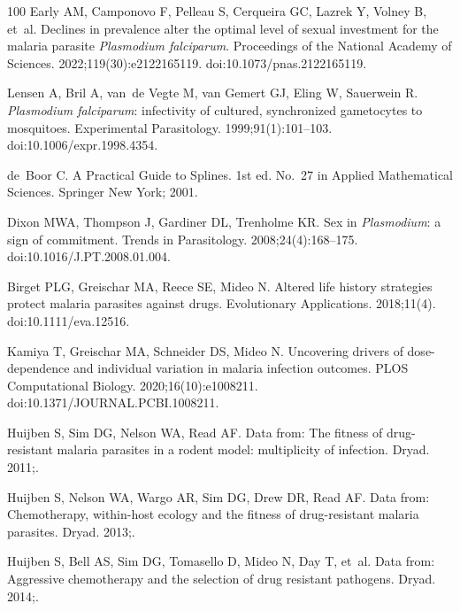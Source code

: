 \documentclass[10pt,letterpaper]{article}
\begin{document}
\begin{thebibliography}{100}
Early AM, Camponovo F, Pelleau S, Cerqueira GC, Lazrek Y, Volney B, et~al.
\newblock Declines in prevalence alter the optimal level of sexual investment for the malaria parasite \textit{{Plasmodium} falciparum}.
\newblock Proceedings of the National Academy of Sciences. 2022;119(30):e2122165119.
\newblock doi:{10.1073/pnas.2122165119}.

Lensen A, Bril A, van~de Vegte M, van Gemert GJ, Eling W, Sauerwein R.
\newblock \textit{{Plasmodium} falciparum}: infectivity of cultured, synchronized gametocytes to mosquitoes.
\newblock Experimental Parasitology. 1999;91(1):101--103.
\newblock doi:{10.1006/expr.1998.4354}.

de~Boor C.
\newblock A {Practical} {Guide} to {Splines}.
\newblock 1st ed. No.~27 in Applied {Mathematical} {Sciences}. Springer New York; 2001.

Dixon MWA, Thompson J, Gardiner DL, Trenholme KR.
\newblock Sex in \textit{{Plasmodium}}: a sign of commitment.
\newblock Trends in Parasitology. 2008;24(4):168--175.
\newblock doi:{10.1016/J.PT.2008.01.004}.

Birget PLG, Greischar MA, Reece SE, Mideo N.
\newblock Altered life history strategies protect malaria parasites against drugs.
\newblock Evolutionary Applications. 2018;11(4).
\newblock doi:{10.1111/eva.12516}.

Kamiya T, Greischar MA, Schneider DS, Mideo N.
\newblock Uncovering drivers of dose-dependence and individual variation in malaria infection outcomes.
\newblock PLOS Computational Biology. 2020;16(10):e1008211.
\newblock doi:{10.1371/JOURNAL.PCBI.1008211}.

Huijben S, Sim DG, Nelson WA, Read AF.
\newblock Data from: {The} fitness of drug-resistant malaria parasites in a rodent model: multiplicity of infection.
\newblock Dryad. 2011;.

Huijben S, Nelson WA, Wargo AR, Sim DG, Drew DR, Read AF.
\newblock Data from: {Chemotherapy}, within-host ecology and the fitness of drug-resistant malaria parasites.
\newblock Dryad. 2013;.

Huijben S, Bell AS, Sim DG, Tomasello D, Mideo N, Day T, et~al.
\newblock Data from: {Aggressive} chemotherapy and the selection of drug resistant pathogens.
\newblock Dryad. 2014;.


\end{thebibliography}
\end{document}
